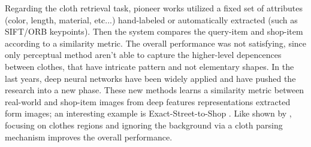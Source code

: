 Regarding the cloth retrieval task, pioneer works utilized a fixed set of attributes (color, length, material, etc...) hand-labeled or automatically extracted (such as SIFT/ORB keypoints). Then the system compares the query-item and shop-item according to a similarity metric. The overall performance was not satisfying, since only perceptual method aren't able to capture the higher-level depencences between clothes, that have intricate pattern and not elementary shapes. In the last years, deep neural networks have been widely applied and have pushed the research into a new phase. These new methods learns a similarity metric between real-world and shop-item images from deep features representations extracted form images; an interesting example is Exact-Street-to-Shop \cite{stree2shop}. Like shown by \cite{wang2017clothing}, focusing on clothes regions and ignoring the background via a cloth parsing mechanism improves the overall performance.
